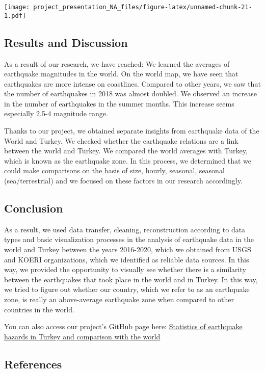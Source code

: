 \documentclass[
]{article}
\begin{document}
\texttt{[image: project\_presentation\_NA\_files/figure-latex/unnamed-chunk-21-1.pdf]}

\hypertarget{results-and-discussion}{%
\subsection{Results and Discussion}\label{results-and-discussion}}

As a result of our research, we have reached: We learned the averages of
earthquake magnitudes in the world. On the world map, we have seen that
earthquakes are more intense on coastlines. Compared to other years, we
saw that the number of earthquakes in 2018 was almost doubled. We
observed an increase in the number of earthquakes in the summer months.
This increase seems especially 2.5-4 magnitude range.

Thanks to our project, we obtained separate insights from earthquake
data of the World and Turkey. We checked whether the earthquake
relations are a link between the world and Turkey. We compared the world
averages with Turkey, which is known as the earthquake zone. In this
process, we determined that we could make comparisons on the basis of
size, hourly, seasonal, seasonal (sea/terrestrial) and we focused on
these factors in our research accordingly.

\hypertarget{conclusion}{%
\subsection{Conclusion}\label{conclusion}}

As a result, we used data transfer, cleaning, reconstruction according
to data types and basic visualization processes in the analysis of
earthquake data in the world and Turkey between the years 2016-2020,
which we obtained from USGS and KOERI organizations, which we identified
as reliable data sources. In this way, we provided the opportunity to
visually see whether there is a similarity between the earthquakes that
took place in the world and in Turkey. In this way, we tried to figure
out whether our country, which we refer to as an earthquake zone, is
really an above-average earthquake zone when compared to other countries
in the world.

You can also access our project's GitHub page here:
\href{https://github.com/MAT381E-Fall21/project_final_report-na}{Statistics
of earthquake hazards in Turkey and comparison with the world}

\hypertarget{references}{%
\subsection{References}\label{references}}
\end{document}
